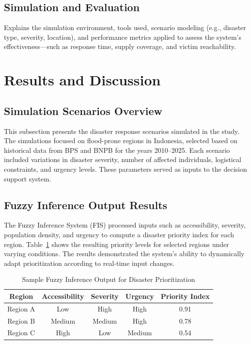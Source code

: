 \documentclass[journal,final,a4paper,twoside,11pt]{IEEEtran}
\begin{document}
\subsection{Simulation and Evaluation}
Explains the simulation environment, tools used, scenario modeling (e.g., disaster type, severity, location), and performance metrics applied to assess the system’s effectiveness—such as response time, supply coverage, and victim reachability.



\section{Results and Discussion}

\subsection{Simulation Scenarios Overview}
This subsection presents the disaster response scenarios simulated in the study. The simulations focused on flood-prone regions in Indonesia, selected based on historical data from BPS and BNPB for the years 2010–2025. Each scenario included variations in disaster severity, number of affected individuals, logistical constraints, and urgency levels. These parameters served as inputs to the decision support system.

\subsection{Fuzzy Inference Output Results}
The Fuzzy Inference System (FIS) processed inputs such as accessibility, severity, population density, and urgency to compute a disaster priority index for each region. Table~\ref{tab:fuzzyoutput} shows the resulting priority levels for selected regions under varying conditions. The results demonstrated the system’s ability to dynamically adapt prioritization according to real-time input changes.

\begin{table}[htbp]
\caption{Sample Fuzzy Inference Output for Disaster Prioritization}
\begin{center}
\begin{tabular}{|c|c|c|c|c|}
\hline
\textbf{Region} & \textbf{Accessibility} & \textbf{Severity} & \textbf{Urgency} & \textbf{Priority Index} \\
\hline
Region A & Low & High & High & 0.91 \\
Region B & Medium & Medium & High & 0.78 \\
Region C & High & Low & Medium & 0.54 \\
\hline
\end{tabular}
\label{tab:fuzzyoutput}
\end{center}
\end{table}
\end{document}
